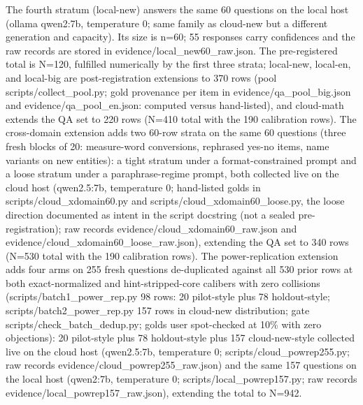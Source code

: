 \documentclass[10pt]{article} %
\begin{document}
The fourth stratum (local-new) answers the same 60 questions on the local host (ollama qwen2:7b, temperature 0; same family as cloud-new but a different generation and capacity).
Its size is n=60; 55 responses carry confidences and the raw records are stored in evidence/local\_new60\_raw.json.
The pre-registered total is N=120, fulfilled numerically by the first three strata; local-new, local-en, and local-big are post-registration extensions to 370 rows (pool scripts/collect\_pool.py; gold provenance per item in evidence/qa\_pool\_big.json and evidence/qa\_pool\_en.json: computed versus hand-listed), and cloud-math extends the QA set to 220 rows (N=410 total with the 190 calibration rows). The cross-domain extension adds two 60-row strata on the same 60 questions (three fresh blocks of 20: measure-word conversions, rephrased yes-no items, name variants on new entities): a tight stratum under a format-constrained prompt and a loose stratum under a paraphrase-regime prompt, both collected live on the cloud host (qwen2.5:7b, temperature 0; hand-listed golds in scripts/cloud\_xdomain60.py and scripts/cloud\_xdomain60\_loose.py, the loose direction documented as intent in the script docstring (not a sealed pre-registration); raw records evidence/cloud\_xdomain60\_raw.json and evidence/cloud\_xdomain60\_loose\_raw.json), extending the QA set to 340 rows (N=530 total with the 190 calibration rows). The power-replication extension adds four arms on 255 fresh questions de-duplicated against all 530 prior rows at both exact-normalized and hint-stripped-core calibers with zero collisions (scripts/batch1\_power\_rep.py 98 rows: 20 pilot-style plus 78 holdout-style; scripts/batch2\_power\_rep.py 157 rows in cloud-new distribution; gate scripts/check\_batch\_dedup.py; golds user spot-checked at 10\% with zero objections): 20 pilot-style plus 78 holdout-style plus 157 cloud-new-style collected live on the cloud host (qwen2.5:7b, temperature 0; scripts/cloud\_powrep255.py; raw records evidence/cloud\_powrep255\_raw.json) and the same 157 questions on the local host (qwen2:7b, temperature 0; scripts/local\_powrep157.py; raw records evidence/local\_powrep157\_raw.json), extending the total to N=942.
\end{document}
